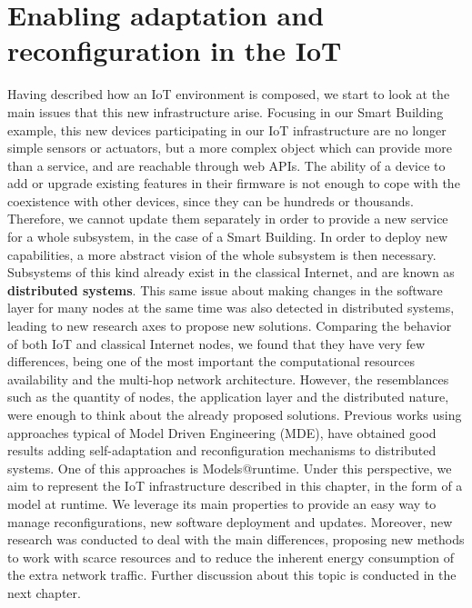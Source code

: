 \section{Enabling adaptation and reconfiguration in the IoT}
Having described how an IoT environment is composed, we start to look at the main issues that this new infrastructure arise.
Focusing in our Smart Building example, this new devices participating in our IoT infrastructure are no longer simple sensors or actuators, but a more complex object which can provide more than a service, and are reachable through web APIs.
The ability of a device to add or upgrade existing features in their firmware is not enough to cope with the coexistence with other devices, since they can be hundreds or thousands.
Therefore, we cannot update them separately in order to provide a new service for a whole subsystem, in the case of a Smart Building.
In order to deploy new capabilities, a more abstract vision of the whole subsystem is then necessary.
Subsystems of this kind already exist in the classical Internet, and are known as \textbf{distributed systems}.
This same issue about making changes in the software layer for many nodes at the same time was also detected in distributed systems, leading to new research axes to propose new solutions.
Comparing the behavior of both IoT and classical Internet nodes, we found that they have very few differences, being one of the most important the computational resources availability and the multi-hop network architecture.
However, the resemblances such as the quantity of nodes, the application layer and the distributed nature, were enough to think about the already proposed solutions.
Previous works using approaches typical of Model Driven Engineering (MDE), have obtained good results adding self-adaptation and reconfiguration mechanisms to distributed systems.
One of this approaches is Models@runtime\cite{morin2009mar}.
Under this perspective, we aim to represent the IoT infrastructure described in this chapter, in the form of a model at runtime.
We leverage its main properties to provide an easy way to manage reconfigurations, new software deployment and updates.
Moreover, new research was conducted to deal with the main differences, proposing new methods to work with scarce resources and to reduce the inherent energy consumption of the extra network traffic.
Further discussion about this topic is conducted in the next chapter.

